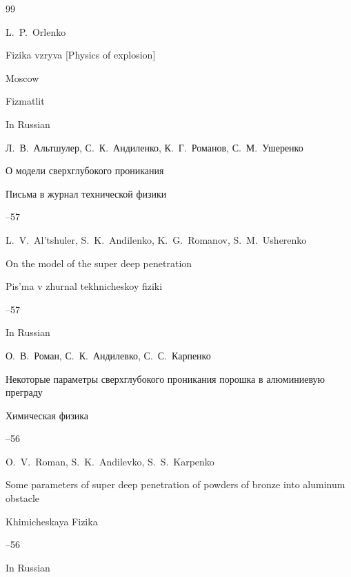 \begin{thebibliography}{99}


\misctransl

\ed L.~P.~Orlenko

\book Fizika vzryva \rm [Physics of explosion]


\publaddr Moscow

\publ Fizmatlit



\lang In Russian






\by Л.~В.~Альтшулер, С.~К.~Андиленко, К.~Г.~Романов, С.~М.~Ушеренко 

\paper О модели сверхглубокого проникания

\jour Письма в журнал технической физики




--57

\misctransl

\by L.~V.~Al'tshuler, S.~K.~Andilenko, K.~G.~Romanov, S.~M.~Usherenko

\paper On the model of the super deep penetration

\jour Pis'ma v zhurnal tekhnicheskoy fiziki




--57

\lang In Russian




\by О.~В.~Роман, С.~К.~Андилевко, С.~С.~Карпенко

\paper Некоторые параметры сверхглубокого проникания порошка в алюминиевую преграду

\jour Химическая физика




--56

\misctransl

\by  O.~V.~Roman, S.~K.~Andilevko, S.~S.~Karpenko

\paper Some parameters of super deep penetration of powders of bronze into aluminum obstacle

\jour Khimicheskaya Fizika




--56

\lang In Russian





\end{thebibliography}



